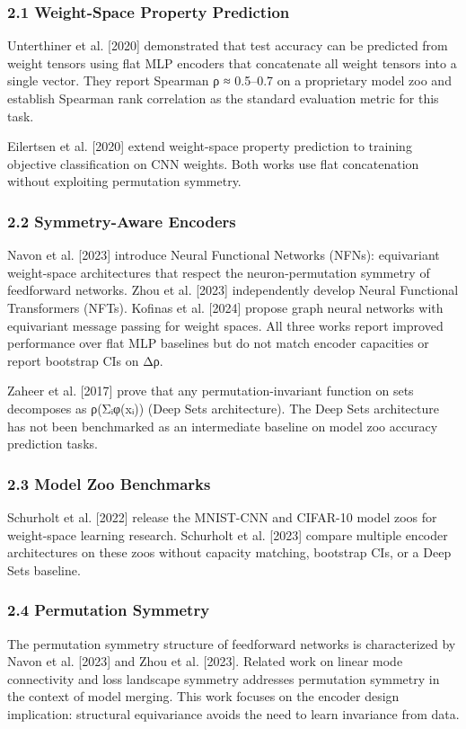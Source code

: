 
\subsubsection{2.1 Weight-Space Property Prediction}

Unterthiner et al. [2020] demonstrated that test accuracy can be predicted from weight tensors using flat MLP encoders that concatenate all weight tensors into a single vector. They report Spearman ρ ≈ 0.5–0.7 on a proprietary model zoo and establish Spearman rank correlation as the standard evaluation metric for this task.

Eilertsen et al. [2020] extend weight-space property prediction to training objective classification on CNN weights. Both works use flat concatenation without exploiting permutation symmetry.

\subsubsection{2.2 Symmetry-Aware Encoders}

Navon et al. [2023] introduce Neural Functional Networks (NFNs): equivariant weight-space architectures that respect the neuron-permutation symmetry of feedforward networks. Zhou et al. [2023] independently develop Neural Functional Transformers (NFTs). Kofinas et al. [2024] propose graph neural networks with equivariant message passing for weight spaces. All three works report improved performance over flat MLP baselines but do not match encoder capacities or report bootstrap CIs on Δρ.

Zaheer et al. [2017] prove that any permutation-invariant function on sets decomposes as ρ(Σᵢφ(xᵢ)) (Deep Sets architecture). The Deep Sets architecture has not been benchmarked as an intermediate baseline on model zoo accuracy prediction tasks.

\subsubsection{2.3 Model Zoo Benchmarks}

Schurholt et al. [2022] release the MNIST-CNN and CIFAR-10 model zoos for weight-space learning research. Schurholt et al. [2023] compare multiple encoder architectures on these zoos without capacity matching, bootstrap CIs, or a Deep Sets baseline.

\subsubsection{2.4 Permutation Symmetry}

The permutation symmetry structure of feedforward networks is characterized by Navon et al. [2023] and Zhou et al. [2023]. Related work on linear mode connectivity \citep{Ainsworthetal2023} and loss landscape symmetry \citep{Entezarietal2022} addresses permutation symmetry in the context of model merging. This work focuses on the encoder design implication: structural equivariance avoids the need to learn invariance from data.

